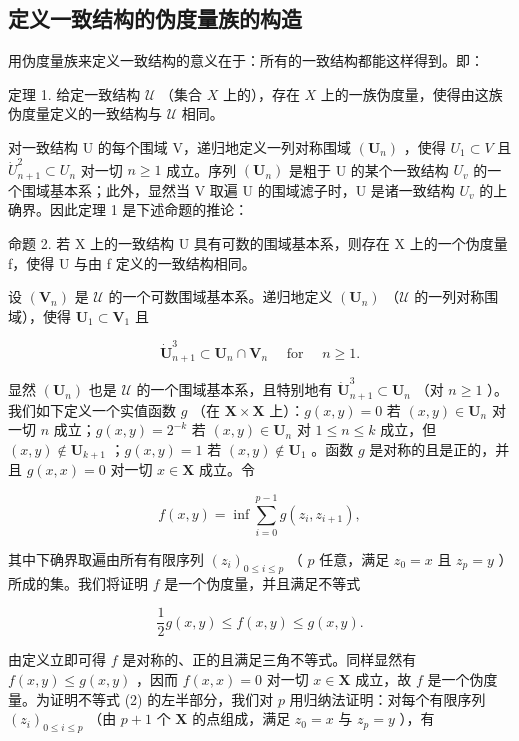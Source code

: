 \subsection{定义一致结构的伪度量族的构造}

用伪度量族来定义一致结构的意义在于：所有的一致结构都能这样得到。即：

定理 1. 给定一致结构 \(\mathcal{U}\) （集合 \(X\) 上的），存在 \(X\) 上的一族伪度量，使得由这族伪度量定义的一致结构与 \(\mathcal{U}\) 相同。

对一致结构 U 的每个围域 V，递归地定义一列对称围域 \((\mathbf{U}_{n})\) ，使得 \(U_{1} \subset V\) 且 \(\dot{U}_{n+1}^{2} \subset U_{n}\) 对一切 \(n \geqslant 1\) 成立。序列 \((\mathbf{U}_{n})\) 是粗于 U 的某个一致结构 \(U_{v}\) 的一个围域基本系；此外，显然当 V 取遍 U 的围域滤子时，U 是诸一致结构 \(U_{v}\) 的上确界。因此定理 1 是下述命题的推论：

命题 2. 若 X 上的一致结构 U 具有可数的围域基本系，则存在 X 上的一个伪度量 f，使得 U 与由 f 定义的一致结构相同。

设 \((\mathbf{V}_n)\) 是 \(\mathcal{U}\) 的一个可数围域基本系。递归地定义 \((\mathbf{U}_n)\) （\(\mathcal{U}\) 的一列对称围域），使得 \(\mathbf{U}_1 \subset \mathbf{V}_1\) 且

\[
\mathbf {\dot {U}} _ {n + 1} ^ {3} \subset \mathbf {U} _ {n} \cap \mathbf {V} _ {n} \quad \text {   for   } \quad n \geqslant 1.
\]

显然 \((\mathbf{U}_n)\) 也是 \(\mathcal{U}\) 的一个围域基本系，且特别地有 \(\dot{\mathbf{U}}_{n+1}^3 \subset \mathbf{U}_n\) （对 \(n \geqslant 1\) ）。我们如下定义一个实值函数 \(g\) （在 \(\mathbf{X} \times \mathbf{X}\) 上）：\(g(x, y) = 0\) 若 \((x, y) \in \mathbf{U}_n\) 对一切 \(n\) 成立；\(g(x, y) = 2^{-k}\) 若 \((x, y) \in \mathbf{U}_n\) 对 \(1 \leqslant n \leqslant k\) 成立，但 \((x, y) \notin \mathbf{U}_{k+1}\) ；\(g(x, y) = 1\) 若 \((x, y) \notin \mathbf{U}_1\) 。函数 \(g\) 是对称的且是正的，并且 \(g(x, x) = 0\) 对一切 \(x \in \mathbf{X}\) 成立。令

\[
f (x, y) = \inf \sum_ {i = 0} ^ {p - 1} g \left(z _ {i}, z _ {i + 1}\right),
\]

其中下确界取遍由所有有限序列 \((z_{i})_{0\leqslant i\leqslant p}\) （ \(p\) 任意，满足 \(z_0 = x\) 且 \(z_{p} = y\) ）所成的集。我们将证明 \(f\) 是一个伪度量，并且满足不等式

\[
\frac {1}{2} g (x, y) \leqslant f (x, y) \leqslant g (x, y).\tag{2}
\]

由定义立即可得 \(f\) 是对称的、正的且满足三角不等式。同样显然有 \(f(x, y) \leqslant g(x, y)\) ，因而 \(f(x, x) = 0\) 对一切 \(x \in \mathbf{X}\) 成立，故 \(f\) 是一个伪度量。为证明不等式 (2) 的左半部分，我们对 \(p\) 用归纳法证明：对每个有限序列 \((z_i)_{0 \leqslant i \leqslant p}\) （由 \(p + 1\) 个 \(\mathbf{X}\) 的点组成，满足 \(z_0 = x\) 与 \(z_p = y\) ），有

